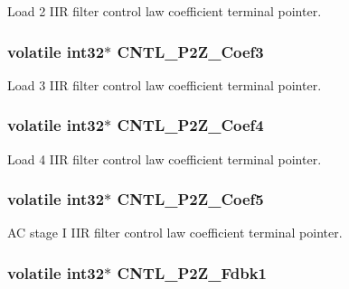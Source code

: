 Load 2 I\-I\-R filter control law coefficient terminal pointer. \hypertarget{a00014_a1e357d296e76299ea04d7a63e4c46d1b}{
\subsubsection[{C\-N\-T\-L\-\_\-2\-P2\-Z\-\_\-\-Coef3}]{\setlength{\rightskip}{0pt plus 5cm}volatile int32$\ast$ C\-N\-T\-L\-\_\-P2\-Z\-\_\-\-Coef3}}\label{a00014_a1e357d296e76299ea04d7a63e4c46d1b}
Load 3 I\-I\-R filter control law coefficient terminal pointer. \hypertarget{a00014_afe468cb1e995b267671e88b8d292aef6}{
\subsubsection[{C\-N\-T\-L\-\_\-2\-P2\-Z\-\_\-\-Coef4}]{\setlength{\rightskip}{0pt plus 5cm}volatile int32$\ast$ C\-N\-T\-L\-\_\-P2\-Z\-\_\-\-Coef4}}\label{a00014_afe468cb1e995b267671e88b8d292aef6}
Load 4 I\-I\-R filter control law coefficient terminal pointer. \hypertarget{a00014_a5fe3f4dd6aac27512c9e0b6fc843b0b6}{
\subsubsection[{C\-N\-T\-L\-\_\-2\-P2\-Z\-\_\-\-Coef5}]{\setlength{\rightskip}{0pt plus 5cm}volatile int32$\ast$ C\-N\-T\-L\-\_\-P2\-Z\-\_\-\-Coef5}}\label{a00014_a5fe3f4dd6aac27512c9e0b6fc843b0b6}
A\-C stage I I\-I\-R filter control law coefficient terminal pointer. \hypertarget{a00014_a9c0418a780375035750c3d4dc16f3ae4}{
\subsubsection[{C\-N\-T\-L\-\_\-2\-P2\-Z\-\_\-\-Fdbk1}]{\setlength{\rightskip}{0pt plus 5cm}volatile int32$\ast$ C\-N\-T\-L\-\_\-P2\-Z\-\_\-\-Fdbk1}}\label{a00014_a9c0418a780375035750c3d4dc16f3ae4}
